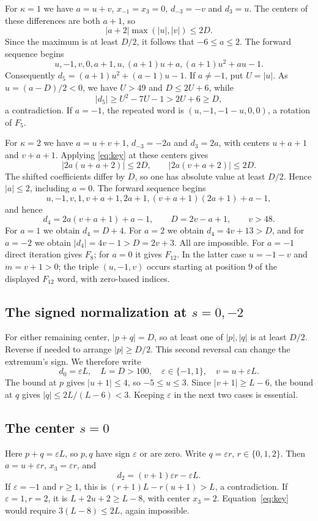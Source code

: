 For $\kappa=1$ we have $a=u+v$, $x_{-1}=x_3=0$,
$d_{-3}=-v$ and $d_3=u$. The centers of these differences
are both $a+1$, so
\[
 |a+2|\max(|u|,|v|)\le2D.
\]
Since the maximum is at least $D/2$, it follows that
$-6\le a\le2$. The forward sequence begins
\[
 u,-1,v,0,a+1,u,(a+1)u+a,(a+1)u^2+au-1.
\]
Consequently $d_5=(a+1)u^2+(a-1)u-1$.
If $a\ne-1$, put $U=|u|$. As $u=(a-D)/2<0$, we have
$U>49$ and $D\le2U+6$, while
\[
 |d_5|\ge U^2-7U-1>2U+6\ge D,
\]
a contradiction. If $a=-1$, the repeated word is
$(u,-1,-1-u,0,0)$, a rotation of $F_5$.

For $\kappa=2$ we have $a=u+v+1$, $d_{-3}=-2a$ and
$d_3=2a$, with centers $u+a+1$ and $v+a+1$.
Applying \eqref{eq:key} at these centers gives
\[
 |2a(u+a+2)|\le2D,\qquad |2a(v+a+2)|\le2D.
\]
The shifted coefficients differ by $D$, so one has absolute
value at least $D/2$. Hence $|a|\le2$, including $a=0$.
The forward sequence begins
\[
 u,-1,v,1,v+a+1,2a+1,(v+a+1)(2a+1)+a-1,
\]
and hence
\[
 d_4=2a(v+a+1)+a-1,\qquad D=2v-a+1,\qquad v>48.
\]
For $a=1$ we obtain $d_4=D+4$. For $a=2$ we obtain
$d_4=4v+13>D$, and for $a=-2$ we obtain
$|d_4|=4v-1>D=2v+3$. All are impossible.
For $a=-1$ direct iteration gives $F_8$; for $a=0$ it
gives $F_{12}$. In the latter case $u=-1-v$ and $m=v+1>0$;
the triple $(u,-1,v)$ occurs starting at position $9$ of
the displayed $F_{12}$ word, with zero-based indices.

\subsection{The signed normalization at \texorpdfstring{$s=0,-2$}{s=0,-2}}
For either remaining center, $|p+q|=D$, so at least one of
$|p|,|q|$ is at least $D/2$. Reverse if needed to arrange
$|p|\ge D/2$. This second reversal can change the extremum's
sign. We therefore write
\begin{equation}
 d_0=\varepsilon L,\quad L=D>100,\quad
 \varepsilon\in\{-1,1\},\quad v=u+\varepsilon L.
 \label{eq:signed}
\end{equation}
The bound at $p$ gives $|u+1|\le4$, so $-5\le u\le3$.
Since $|v+1|\ge L-6$, the bound at $q$ gives
$|q|\le2L/(L-6)<3$. Keeping $\varepsilon$ in the next
two cases is essential.

\subsection{The center \texorpdfstring{$s=0$}{s=0}}
Here $p+q=\varepsilon L$, so $p,q$ have sign
$\varepsilon$ or are zero. Write $q=\varepsilon r$,
$r\in\{0,1,2\}$. Then $a=u+\varepsilon r$,
$x_3=\varepsilon r$, and
\[
 d_2=(v+1)\varepsilon r-\varepsilon L.
\]
If $\varepsilon=-1$ and $r\ge1$, this is
$(r+1)L-r(u+1)>L$, a contradiction.
If $\varepsilon=1,r=2$, it is $L+2u+2\ge L-8$,
with center $x_3=2$. Equation~\eqref{eq:key} would require
$3(L-8)\le2L$, again impossible.

